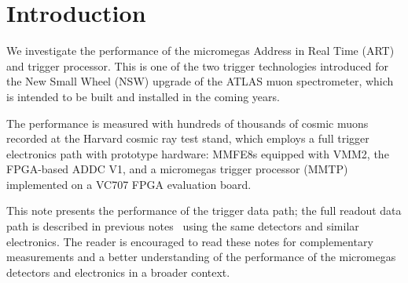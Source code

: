 \section{Introduction}
\label{sec:intro}

We investigate the performance of the micromegas Address in Real Time (ART) and trigger processor. This is one of the two trigger technologies introduced for the New Small Wheel (NSW) upgrade of the ATLAS muon spectrometer, which is intended to be built and installed in the coming years. 

The performance is measured with hundreds of thousands of cosmic muons recorded at the Harvard cosmic ray test stand, which employs a full trigger electronics path with prototype hardware: MMFE8s equipped with VMM2, the FPGA-based ADDC V1, and a micromegas trigger processor (MMTP) implemented on a VC707 FPGA evaluation board.

This note presents the performance of the trigger data path; the full readout data path is described in previous notes~\cite{noisy,noiseless} using the same detectors and similar electronics. The reader is encouraged to read these notes for complementary measurements and a better understanding of the performance of the micromegas detectors and electronics in a broader context.


